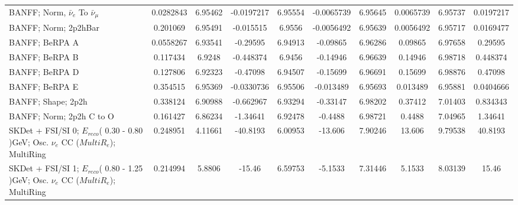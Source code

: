 \begin{tabular}{| l | S | S  S | S  S | S  S | S  S | }
                               BANFF; Norm, $\bar{\nu}_{e}$ To $\bar{\nu}_{\mu}$ &       0.0282843 &         6.95462 &      -0.0197217 &         6.95554 &      -0.0065739 &         6.95645 &       0.0065739 &         6.95737 &       0.0197217 \\ 
                                                            BANFF; Norm; 2p2hBar &        0.201069 &         6.95491 &       -0.015515 &          6.9556 &      -0.0056492 &         6.95639 &       0.0056492 &         6.95717 &       0.0169477 \\ 
                                                                  BANFF; BeRPA A &       0.0558267 &         6.93541 &        -0.29595 &         6.94913 &        -0.09865 &         6.96286 &         0.09865 &         6.97658 &         0.29595 \\ 
                                                                  BANFF; BeRPA B &        0.117434 &          6.9248 &       -0.448374 &          6.9456 &        -0.14946 &         6.96639 &         0.14946 &         6.98718 &        0.448374 \\ 
                                                                  BANFF; BeRPA D &        0.127806 &         6.92323 &        -0.47098 &         6.94507 &        -0.15699 &         6.96691 &         0.15699 &         6.98876 &         0.47098 \\ 
                                                                  BANFF; BeRPA E &        0.354515 &         6.95369 &      -0.0330736 &         6.95506 &       -0.013489 &         6.95693 &        0.013489 &         6.95881 &       0.0404666 \\ 
                                                              BANFF; Shape; 2p2h &        0.338124 &         6.90988 &       -0.662967 &         6.93294 &        -0.33147 &         6.98202 &         0.37412 &         7.01403 &        0.834343 \\ 
                                                        BANFF; Norm; 2p2h C to O &        0.161427 &         6.86234 &        -1.34641 &         6.92478 &         -0.4488 &         6.98721 &          0.4488 &         7.04965 &         1.34641 \\ 
SKDet + FSI/SI  0; $E_{reco}$( 0.30 - 0.80 )GeV; Osc. $\nu_{e}$ CC ($MultiR_{e}$); MultiRing &        0.248951 &         4.11661 &        -40.8193 &         6.00953 &         -13.606 &         7.90246 &          13.606 &         9.79538 &         40.8193 \\ 
SKDet + FSI/SI  1; $E_{reco}$( 0.80 - 1.25 )GeV; Osc. $\nu_{e}$ CC ($MultiR_{e}$); MultiRing &        0.214994 &          5.8806 &          -15.46 &         6.59753 &         -5.1533 &         7.31446 &          5.1533 &         8.03139 &           15.46 \\ 

\end{tabular}
